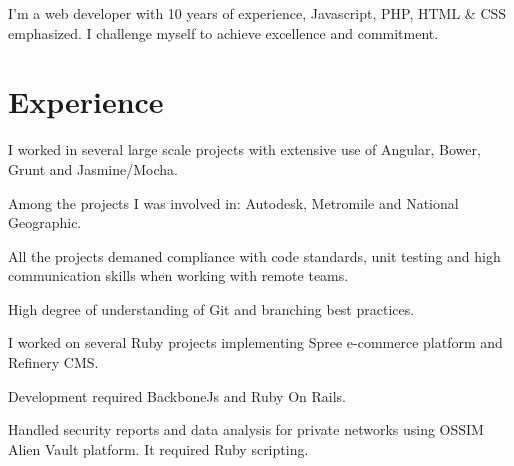 \documentclass[]{deedy-resume-openfont}
\begin{document}
\begin{minipage}[t]{0.66\textwidth}

\vspace{\topsep}

{\Large I'm a web developer with 10 years of experience, Javascript, PHP, HTML \& CSS emphasized. I challenge myself to achieve excellence and commitment.}

\hrulefill


\section{Experience}


\begin{tightemize}
\item I worked in several large scale projects with extensive use of Angular, Bower, Grunt and Jasmine/Mocha.
\item Among the projects I was involved in: Autodesk, Metromile and National Geographic.
\item All the projects demaned compliance with code standards, unit testing and high communication skills when working with remote teams. 
\item High degree of understanding of Git and branching best practices.
\end{tightemize}

\sectionsep



\begin{tightemize}
\item I worked on several Ruby projects implementing Spree e-commerce platform and Refinery CMS.
\item Development required BackboneJs and Ruby On Rails.
\item Handled security reports and data analysis for private networks using OSSIM Alien Vault platform. It required Ruby scripting.
\end{tightemize}

\sectionsep


\end{minipage}
\end{document}
